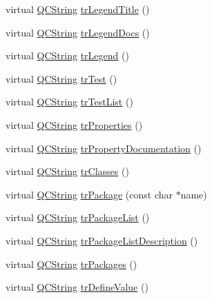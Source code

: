 \begin{DoxyCompactItemize}
\item 
virtual \mbox{\hyperlink{class_q_c_string}{Q\+C\+String}} \mbox{\hyperlink{class_translator_slovene_aec8bc99ae2e1aa19b8399c733f592ae5}{tr\+Legend\+Title}} ()
\item 
virtual \mbox{\hyperlink{class_q_c_string}{Q\+C\+String}} \mbox{\hyperlink{class_translator_slovene_a1f997f8cea119d9c78f2fd56d3108c09}{tr\+Legend\+Docs}} ()
\item 
virtual \mbox{\hyperlink{class_q_c_string}{Q\+C\+String}} \mbox{\hyperlink{class_translator_slovene_a40da91c6f0cd0595974b7f06201ba9ad}{tr\+Legend}} ()
\item 
virtual \mbox{\hyperlink{class_q_c_string}{Q\+C\+String}} \mbox{\hyperlink{class_translator_slovene_a05b84fb4d4a609fa630792cce27a067f}{tr\+Test}} ()
\item 
virtual \mbox{\hyperlink{class_q_c_string}{Q\+C\+String}} \mbox{\hyperlink{class_translator_slovene_a6b30c8004a89d8923af9116afcd47354}{tr\+Test\+List}} ()
\item 
virtual \mbox{\hyperlink{class_q_c_string}{Q\+C\+String}} \mbox{\hyperlink{class_translator_slovene_a3af0518026b0c37dd7faa0fd4a50d942}{tr\+Properties}} ()
\item 
virtual \mbox{\hyperlink{class_q_c_string}{Q\+C\+String}} \mbox{\hyperlink{class_translator_slovene_ae7b3b762024f64c17cfc55fcdf6e501f}{tr\+Property\+Documentation}} ()
\item 
virtual \mbox{\hyperlink{class_q_c_string}{Q\+C\+String}} \mbox{\hyperlink{class_translator_slovene_a6c55696ab318e449705d76fef413f999}{tr\+Classes}} ()
\item 
virtual \mbox{\hyperlink{class_q_c_string}{Q\+C\+String}} \mbox{\hyperlink{class_translator_slovene_a84d64ca0fa36953ef758ee8a29a19943}{tr\+Package}} (const char $\ast$name)
\item 
virtual \mbox{\hyperlink{class_q_c_string}{Q\+C\+String}} \mbox{\hyperlink{class_translator_slovene_a35c9c756ae0608b2995178a613c31d16}{tr\+Package\+List}} ()
\item 
virtual \mbox{\hyperlink{class_q_c_string}{Q\+C\+String}} \mbox{\hyperlink{class_translator_slovene_ad8ea544349d61167bb4aa472fff5d66f}{tr\+Package\+List\+Description}} ()
\item 
virtual \mbox{\hyperlink{class_q_c_string}{Q\+C\+String}} \mbox{\hyperlink{class_translator_slovene_af7fbcf11da09dddbff688ecfc196a927}{tr\+Packages}} ()
\item 
virtual \mbox{\hyperlink{class_q_c_string}{Q\+C\+String}} \mbox{\hyperlink{class_translator_slovene_ab1712e6a163ddf505ccf3f87496d239f}{tr\+Define\+Value}} ()

\end{DoxyCompactItemize}
